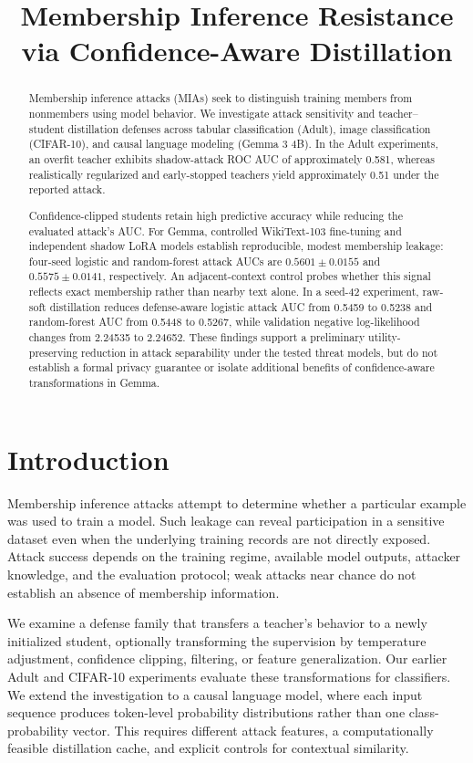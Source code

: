 \documentclass[conference]{IEEEtran}
\title{Membership Inference Resistance via Confidence-Aware Distillation}
\author{
\IEEEauthorblockN{Joseph D. Janicki}
\IEEEauthorblockA{
University of Mississippi \\
joseph.d.janicki@gmail.com
}
}
\begin{document}
\maketitle

\begin{abstract}
Membership inference attacks (MIAs) seek to distinguish training members from nonmembers using model behavior. We investigate attack sensitivity and teacher--student distillation defenses across tabular classification (Adult), image classification (CIFAR-10), and causal language modeling (Gemma 3 4B). In the Adult experiments, an overfit teacher exhibits shadow-attack ROC AUC of approximately 0.581, whereas realistically regularized and early-stopped teachers yield approximately 0.51 under the reported attack. 

Confidence-clipped students retain high predictive accuracy while reducing the evaluated attack's AUC. For Gemma, controlled WikiText-103 fine-tuning and independent shadow LoRA models establish reproducible, modest membership leakage: four-seed logistic and random-forest attack AUCs are $0.5601\pm0.0155$ and $0.5575\pm0.0141$, respectively. An adjacent-context control probes whether this signal reflects exact membership rather than nearby text alone. In a seed-42 experiment, raw-soft distillation reduces defense-aware logistic attack AUC from 0.5459 to 0.5238 and random-forest AUC from 0.5448 to 0.5267, while validation negative log-likelihood changes from 2.24535 to 2.24652. These findings support a preliminary utility-preserving reduction in attack separability under the tested threat models, but do not establish a formal privacy guarantee or isolate additional benefits of confidence-aware transformations in Gemma.
\end{abstract}

\section{Introduction}
Membership inference attacks attempt to determine whether a particular example was used to train a model. Such leakage can reveal participation in a sensitive dataset even when the underlying training records are not directly exposed. Attack success depends on the training regime, available model outputs, attacker knowledge, and the evaluation protocol; weak attacks near chance do not establish an absence of membership information.

We examine a defense family that transfers a teacher's behavior to a newly initialized student, optionally transforming the supervision by temperature adjustment, confidence clipping, filtering, or feature generalization. Our earlier Adult and CIFAR-10 experiments evaluate these transformations for classifiers. We extend the investigation to a causal language model, where each input sequence produces token-level probability distributions rather than one class-probability vector. This requires different attack features, a computationally feasible distillation cache, and explicit controls for contextual similarity.
\end{document}
